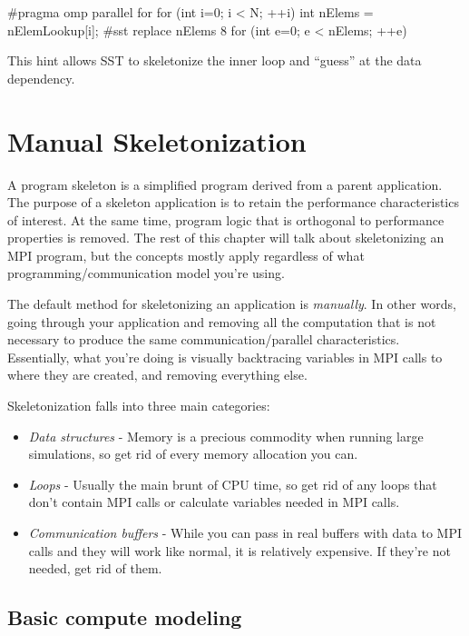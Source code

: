 \begin{CppCode}
#pragma omp parallel for
for (int i=0; i < N; ++i){
  int nElems = nElemLookup[i];
  #sst replace nElems 8
  for (int e=0; e < nElems; ++e){
  }
}
\end{CppCode}
This hint allows SST to skeletonize the inner loop and ``guess'' at the data dependency.

\section{Manual Skeletonization}
\label{sec:manSkeletonization}

A program skeleton is a simplified program derived from a parent application. The purpose of a skeleton application is to retain the performance characteristics of interest. At the same time, program logic that is orthogonal to performance properties is removed.  The rest of this chapter will talk about skeletonizing an MPI program, but the concepts mostly apply regardless of what programming/communication model you're using. 

The default method for skeletonizing an application is \textit{manually}. In other words, going through your application and removing all the computation that is not necessary to produce the same communication/parallel characteristics.   Essentially, what you're doing is visually backtracing variables in MPI calls to where they are created, and removing everything else.  

Skeletonization falls into three main categories:

\begin{itemize}
\item \textit{Data structures} - Memory is a precious commodity when running large simulations, so get rid of every memory allocation you can.
\item \textit{Loops} - Usually the main brunt of CPU time, so get rid of any loops that don't contain MPI calls or calculate variables needed in MPI calls.
\item \textit{Communication buffers} - While you can pass in real buffers with data to \sstmacro MPI calls and they will work like normal, it is relatively expensive. If they're not needed, get rid of them.
\end{itemize}

\subsection{Basic compute modeling}
\label{subsec:basicCompute}

